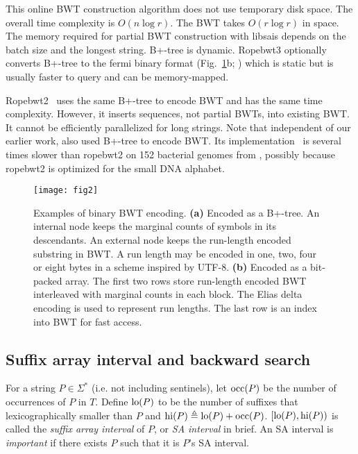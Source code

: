 \documentclass[webpdf,contemporary,large,namedate]{oup-authoring-template}%
\begin{document}
This online BWT construction algorithm does not use temporary disk space.
The overall time complexity is $O(n\log r)$.
The BWT takes $O(r\log r)$ in space.
The memory required for partial BWT construction with libsais depends on the batch size and the longest string.
B+-tree is dynamic.
Ropebwt3 optionally converts B+-tree to the fermi binary format (Fig.~\ref{fig:2}b; \citealt*{Li:2012fk})
which is static but is usually faster to query and can be memory-mapped.

Ropebwt2~\citep{Li:2014ab} uses the same B+-tree to encode BWT and has the same time complexity.
However, it inserts sequences, not partial BWTs, into existing BWT.
It cannot be efficiently parallelized for long strings.
Note that independent of our earlier work, \citet{DBLP:journals/jda/OhnoSTIS18} also used B+-tree to encode BWT.
Its implementation~\citep{DBLP:journals/tcs/BannaiGI20} is several times slower than ropebwt2 on 152 bacterial genomes from \citet{Li:2024ab},
possibly because ropebwt2 is optimized for the small DNA alphabet.

\begin{figure}[bt]
\centering
\texttt{[image: fig2]}
\caption{Examples of binary BWT encoding.
{\bf (a)} Encoded as a B+-tree.
An internal node keeps the marginal counts of symbols in its descendants.
An external node keeps the run-length encoded substring in BWT.
A run length may be encoded in one, two, four or eight bytes in a scheme inspired by UTF-8.
{\bf (b)} Encoded as a bit-packed array.
The first two rows store run-length encoded BWT interleaved with marginal counts in each block.
The Elias delta encoding is used to represent run lengths.
The last row is an index into BWT for fast access.
}\label{fig:2}
\end{figure}

\subsection{Suffix array interval and backward search}

For a string $P\in\Sigma^*$ (i.e. not including sentinels), let ${\rm occ}(P)$ be the number of occurrences of $P$ in $T$.
Define ${\rm lo}(P)$ to be the number of suffixes that lexicographically smaller than $P$
and ${\rm hi}(P)\triangleq {\rm lo}(P)+{\rm occ}(P)$.
$[{\rm lo}(P),{\rm hi}(P))$ is called the \emph{suffix array interval} of $P$, or \emph{SA interval} in brief.
An SA interval is \emph{important} if there exists $P$ such that it is $P$'s SA interval.
\end{document}
